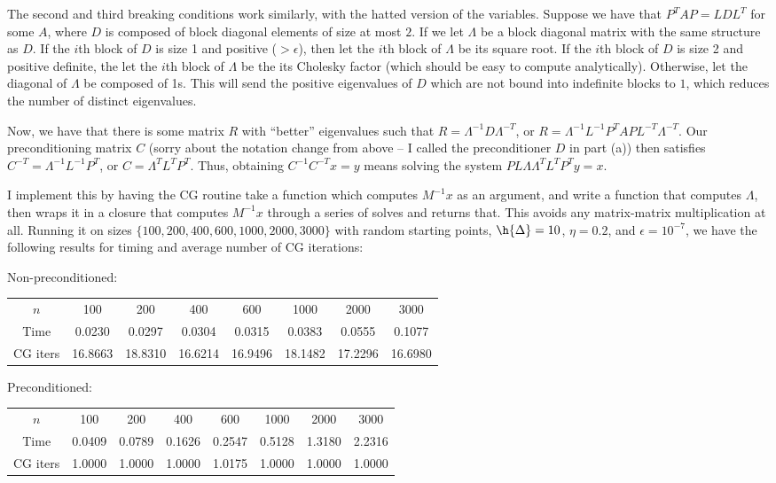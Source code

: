 \documentclass{article}
\newcommand{\ep}{\epsilon}
\begin{document}
The second and third breaking conditions work similarly, with the hatted version of the variables.
Suppose we have that $P^TAP=LDL^T$ for some $A$, where $D$ is composed of block diagonal elements of size at most $2$. If we let $\Lambda$ be a block diagonal matrix with the same structure as $D$. If the $i$th block of $D$ is size 1 and positive ($>\ep$), then let the $i$th block of $\Lambda$ be its square root. If the $i$th block of $D$ is size 2 and positive definite, the let the $i$th block of $\Lambda$ be the its Cholesky factor (which should be easy to compute analytically). Otherwise, let the diagonal of $\Lambda$ be composed of 1s. This will send the positive eigenvalues of $D$ which are not bound into indefinite blocks to $1$, which reduces the number of distinct eigenvalues.

Now, we have that there is some matrix $R$ with ``better'' eigenvalues such that $R=\Lambda^{-1}D\Lambda^{-T}$, or $R=\Lambda^{-1}L^{-1}P^TAPL^{-T}\Lambda^{-T}$. Our preconditioning matrix $C$ (sorry about the notation change from above -- I called the preconditioner $D$ in part (a)) then satisfies $C^{-T}=\Lambda^{-1}L^{-1}P^T$, or $C=\Lambda^TL^TP^T$. Thus, obtaining $C^{-1}C^{-T}x=y$ means solving the system $PL\Lambda\Lambda^TL^TP^Ty=x$. 

I implement this by having the CG routine take a function which computes $M^{-1}x$ as an argument, and write a function that computes $\Lambda$, then wraps it in a closure that computes $M^{-1}x$ through a series of solves and returns that. This avoids any matrix-matrix multiplication at all.
Running it on sizes $\{100, 200, 400, 600, 1000, 2000, 3000\}$ with random starting points, $\h{\Delta}=10$, $\eta=0.2$, and $\ep=10^{-7}$, we have the following results for timing and average number of CG iterations:

Non-preconditioned:

\begin{tabular}{c|ccccccc}
    $n$&100&200&400&600&1000&2000&3000\\
    Time&0.0230&0.0297&0.0304&0.0315&0.0383&0.0555&0.1077\\
    CG iters&16.8663&18.8310&16.6214&16.9496&18.1482&17.2296&16.6980\\
\end{tabular}

Preconditioned:

\begin{tabular}{c|ccccccc}
    $n$&100&200&400&600&1000&2000&3000\\
    Time&0.0409&0.0789&0.1626&0.2547&0.5128&1.3180&2.2316\\
    CG iters&1.0000&1.0000&1.0000&1.0175&1.0000&1.0000&1.0000\\
\end{tabular}
\end{document}

